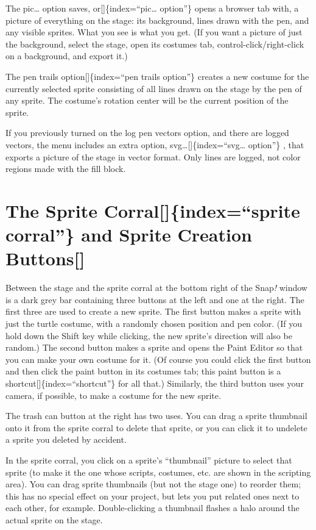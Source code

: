 \documentclass[
  letterpaper,
]{book}
\begin{document}
The pic\ldots{} option saves, or{[}{]}\{index=``pic\ldots{} option''\}
opens a browser tab with, a picture of everything on the stage: its
background, lines drawn with the pen, and any visible sprites. What you
see is what you get. (If you want a picture of just the background,
select the stage, open its costumes tab, control-click/right-click on a
background, and export it.)

The pen trails option{[}{]}\{index=``pen trails option''\} creates a new
costume for the currently selected sprite consisting of all lines drawn
on the stage by the pen of any sprite. The costume's rotation center
will be the current position of the sprite.

If you previously turned on the log pen vectors option, and there are
logged vectors, the menu includes an extra option,
svg\ldots{[}{]}\{index=``svg\ldots{} option''\} , that exports a picture
of the stage in vector format. Only lines are logged, not color regions
made with the fill block.

\section{The Sprite Corral{[}{]}\{index=``sprite corral''\} and Sprite
Creation
Buttons{[}{]}}\label{the-sprite-corralindexsprite-corral-and-sprite-creation-buttons}

Between the stage and the sprite corral at the bottom right of the
Snap\emph{!} window is a dark grey bar containing three buttons at the
left and one at the right. The first three are used to create a new
sprite. The first button makes a sprite with just the turtle costume,
with a randomly chosen position and pen color. (If you hold down the
Shift key while clicking, the new sprite's direction will also be
random.) The second button makes a sprite and opens the Paint Editor so
that you can make your own costume for it. (Of course you could click
the first button and then click the paint button in its costumes tab;
this paint button is a shortcut{[}{]}\{index=``shortcut''\} for all
that.) Similarly, the third button uses your camera, if possible, to
make a costume for the new sprite.

The trash can button at the right has two uses. You can drag a sprite
thumbnail onto it from the sprite corral to delete that sprite, or you
can click it to undelete a sprite you deleted by accident.

In the sprite corral, you click on a sprite's ``thumbnail'' picture to
select that sprite (to make it the one whose scripts, costumes, etc. are
shown in the scripting area). You can drag sprite thumbnails (but not
the stage one) to reorder them; this has no special effect on your
project, but lets you put related ones next to each other, for example.
Double-clicking a thumbnail flashes a halo around the actual sprite on
the stage.
\end{document}
